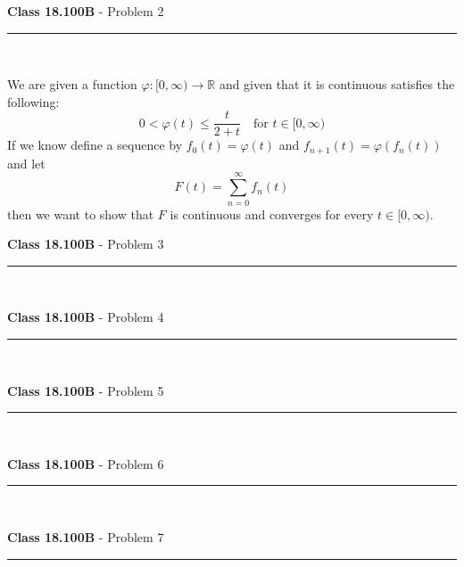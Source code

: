 \documentclass[11pt,reqno]{article}
\begin{document}
\vspace{15pt}
\begin{flushleft} 
\textbf{Class 18.100B} - Problem 2\\
\rule{500pt}{1pt}\\
\end{flushleft} 

We are given a function $\varphi : [0,\infty) \to \mathbb{R}$ and given that it is continuous satisfies the following:
\[ 0 < \varphi(t) \le \frac{t}{2+t} \quad \text{for $t \in [0,\infty)$} \]
If we know define a sequence by $f_0(t) = \varphi(t)$ and $f_{n+1}(t) = \varphi(f_n(t))$ and let 
\[ F(t) = \sum_{n=0}^\infty f_n(t) \]
then we want to show that $F$ is continuous and converges for every $t \in [0,\infty)$.

\vspace{15pt}
\begin{flushleft} 
\textbf{Class 18.100B} - Problem 3\\
\rule{500pt}{1pt}\\
\end{flushleft} 
 
\vspace{15pt}
\begin{flushleft} 
\textbf{Class 18.100B} - Problem 4\\
\rule{500pt}{1pt}\\
\end{flushleft} 


\vspace{15pt}
\begin{flushleft} 
\textbf{Class 18.100B} - Problem 5\\
\rule{500pt}{1pt}\\
\end{flushleft} 


\vspace{15pt}
\begin{flushleft} 
\textbf{Class 18.100B} - Problem 6\\
\rule{500pt}{1pt}\\
\end{flushleft} 


\vspace{15pt}
\begin{flushleft} 
\textbf{Class 18.100B} - Problem 7\\
\rule{500pt}{1pt}\\
\end{flushleft} 
\end{document}
